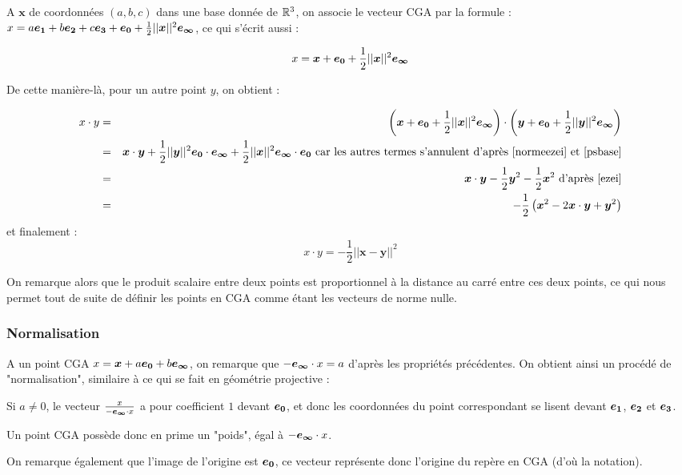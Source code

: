 A $\bm{x}$ de coordonnées $(a,b,c)$ dans une base donnée de $\mathbb{R}^3$, on associe le vecteur CGA par la formule : $x = a \bm{e_1} + b \bm{e_2} + c \bm{e_3} + \bm{e_0} + \frac{1}{2}||\bm{x}||^2 \bm{e_{\infty}}$, ce qui s'écrit aussi : 

$$x = \bm{x} + \bm{e_0} + \frac{1}{2}||\bm{x}||^2 \bm{e_{\infty}}$$

De cette manière-là, pour un autre point $y$, on obtient : 

\begin{eqnarray*}
x \cdot y & = &  \left(\bm{x} + \bm{e_0} + \frac{1}{2}||\bm{x}||^2 \ei\right) \cdot  \left(\bm{y} + \bm{e_0} + \frac{1}{2}||\bm{y}||^2 \ei\right) \\
& = & \bm{x} \cdot \bm{y} +  \frac{1}{2}||\bm{y}||^2 \ez \cdot \ei +  \frac{1}{2}||\bm{x}||^2 \ei \cdot \ez \text{ car les autres termes s'annulent d'après }\ref{normeezei}\text{ et } \ref{psbase} \\
& = & \bm{x} \cdot \bm{y} -  \frac{1}{2}\bm{y}^2 -  \frac{1}{2}\bm{x}^2 \text{ d'après }\ref{ezei} \\
& = & - \frac{1}{2} \left( \bm{x}^2 -2 \bm{x} \cdot \bm{y} + \bm{y}^2\right)  \\
\end{eqnarray*}
et finalement : 
$$ x \cdot y =  - \frac{1}{2} ||\bm{x}-\bm{y}||^2$$

On remarque alors que le produit scalaire entre deux points est proportionnel à la distance au carré entre ces deux points, ce qui nous permet tout de suite de définir les points en CGA comme étant les vecteurs de norme nulle.
 
\subsubsection{Normalisation}

A un point CGA $x = \bm{x} + a \bm{e_0} + b \bm{e_{\infty}}$, on remarque que $-\bm{e_{\infty}} \cdot x = a$ d'après les propriétés précédentes. On obtient ainsi un procédé de "normalisation", similaire à ce qui se fait en géométrie projective : 

Si $a\neq 0$, le vecteur $\frac{x}{-\bm{e_{\infty}} \cdot x}$ a pour coefficient $1$ devant $\bm{e_{0}}$, et donc les coordonnées du point correspondant se lisent devant $\bm{e_{1}}$, $\bm{e_{2}}$ et $\bm{e_{3}}$.

Un point CGA possède donc en prime un "poids", égal à $-\bm{e_{\infty}} \cdot x$. 

On remarque également que l'image de l'origine est $\bm{e_{0}}$, ce vecteur représente donc l'origine du repère en CGA (d'où la notation).


